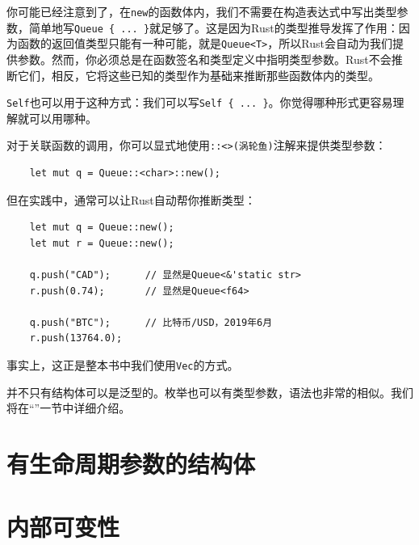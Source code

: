 你可能已经注意到了，在\texttt{new}的函数体内，我们不需要在构造表达式中写出类型参数，简单地写\texttt{Queue \{ ... \}}就足够了。这是因为Rust的类型推导发挥了作用：因为函数的返回值类型只能有一种可能，就是\texttt{Queue<T>}，所以Rust会自动为我们提供参数。然而，你必须总是在函数签名和类型定义中指明类型参数。Rust不会推断它们，相反，它将这些已知的类型作为基础来推断那些函数体内的类型。

\texttt{Self}也可以用于这种方式：我们可以写\texttt{Self \{ ... \}}。你觉得哪种形式更容易理解就可以用哪种。

对于关联函数的调用，你可以显式地使用\texttt{::<>(涡轮鱼)}注解来提供类型参数：
\begin{verbatim}
    let mut q = Queue::<char>::new();
\end{verbatim}

但在实践中，通常可以让Rust自动帮你推断类型：
\begin{verbatim}
    let mut q = Queue::new();
    let mut r = Queue::new();

    q.push("CAD");      // 显然是Queue<&'static str>
    r.push(0.74);       // 显然是Queue<f64>

    q.push("BTC");      // 比特币/USD，2019年6月 
    r.push(13764.0);    
\end{verbatim}

事实上，这正是整本书中我们使用\texttt{Vec}的方式。

并不只有结构体可以是泛型的。枚举也可以有类型参数，语法也非常的相似。我们将在“”一节中详细介绍。

\section{有生命周期参数的结构体}

\section{内部可变性}\label{intermut}
